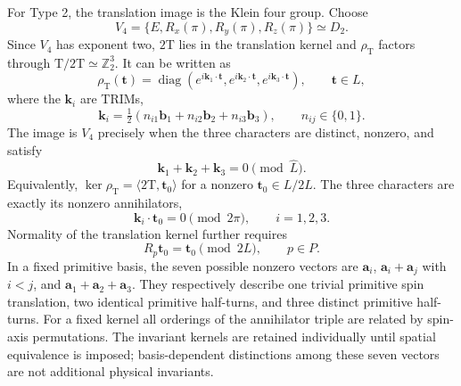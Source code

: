 For Type 2, the translation image is the Klein four group. Choose
\begin{equation}
 V_4=\{E,R_x(\pi),R_y(\pi),R_z(\pi)\}\simeq D_2.
 \tag{23}\label{algmerge:klein}
\end{equation}
Since $V_4$ has exponent two, $2\mathrm T$ lies in the translation
kernel and $\rho_{\mathrm T}$ factors through
$\mathrm T/2\mathrm T\simeq\mathbb Z_2^3$. It can be written as
\begin{equation}
 \rho_{\mathrm T}(\bm t)=
 \operatorname{diag}(e^{i\bm k_1\cdot\bm t},
 e^{i\bm k_2\cdot\bm t},e^{i\bm k_3\cdot\bm t}),\qquad\bm t\in L,
 \tag{24}\label{algmerge:kleintranslation}
\end{equation}
where the $\bm k_i$ are TRIMs,
\begin{equation}
 \bm k_i=\tfrac12(n_{i1}\bm b_1+n_{i2}\bm b_2+n_{i3}\bm b_3),
 \qquad n_{ij}\in\{0,1\}.
 \tag{25}\label{algmerge:trim}
\end{equation}
The image is $V_4$ precisely when the three characters are distinct,
nonzero, and satisfy
\begin{equation}
 \bm k_1+\bm k_2+\bm k_3=0\pmod{\widehat L}.
 \tag{26}\label{algmerge:sumtrim}
\end{equation}
Equivalently, $\ker\rho_{\mathrm T}=\langle2\mathrm T,\bm t_0\rangle$
for a nonzero $\bm t_0\in L/2L$. The three characters are exactly
its nonzero annihilators,
\begin{equation}
 \bm k_i\cdot\bm t_0=0\pmod{2\pi},\qquad i=1,2,3.
 \tag{27}\label{algmerge:annihilators}
\end{equation}
Normality of the translation kernel further requires
\begin{equation}
 R_p\bm t_0=\bm t_0\pmod{2L},\qquad p\in P.
 \tag{28}\label{algmerge:invariantkernel}
\end{equation}
In a fixed primitive basis, the seven possible nonzero vectors are
$\bm a_i$, $\bm a_i+\bm a_j$ with $i<j$, and
$\bm a_1+\bm a_2+\bm a_3$. They respectively describe one trivial
primitive spin translation, two identical primitive half-turns,
and three distinct primitive half-turns. For a fixed kernel all
orderings of the annihilator triple are related by spin-axis
permutations. The invariant kernels are retained individually until
spatial equivalence is imposed; basis-dependent distinctions among
these seven vectors are not additional physical invariants.

